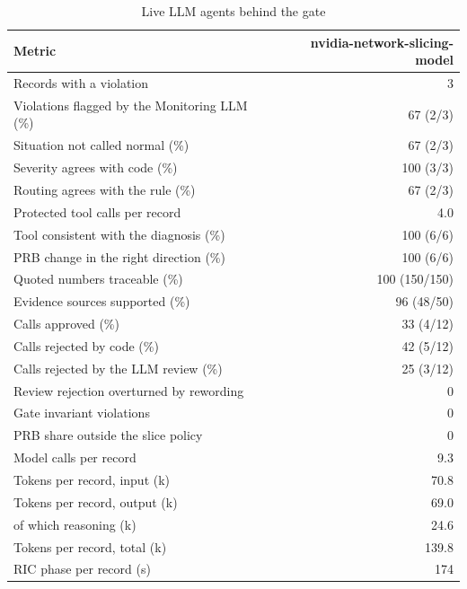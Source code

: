 \begin{table}[!t]
\centering
\caption{Live LLM agents behind the gate}\label{tab:live}
\footnotesize
\setlength{\tabcolsep}{3pt}
\begin{tabular}{@{}lr@{}}
\toprule
Metric & nvidia-network-slicing-model \\
\midrule
Records with a violation & 3 \\
Violations flagged by the Monitoring LLM (\%) & 67 (2/3) \\
Situation not called normal (\%) & 67 (2/3) \\
Severity agrees with code (\%) & 100 (3/3) \\
Routing agrees with the rule (\%) & 67 (2/3) \\
Protected tool calls per record & 4.0 \\
Tool consistent with the diagnosis (\%) & 100 (6/6) \\
PRB change in the right direction (\%) & 100 (6/6) \\
Quoted numbers traceable (\%) & 100 (150/150) \\
Evidence sources supported (\%) & 96 (48/50) \\
Calls approved (\%) & 33 (4/12) \\
Calls rejected by code (\%) & 42 (5/12) \\
Calls rejected by the LLM review (\%) & 25 (3/12) \\
Review rejection overturned by rewording & 0 \\
Gate invariant violations & 0 \\
PRB share outside the slice policy & 0 \\
Model calls per record & 9.3 \\
Tokens per record, input (k) & 70.8 \\
Tokens per record, output (k) & 69.0 \\
\quad of which reasoning (k) & 24.6 \\
Tokens per record, total (k) & 139.8 \\
RIC phase per record (s) & 174 \\
\bottomrule
\end{tabular}
\end{table}
